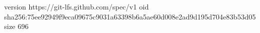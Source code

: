 version https://git-lfs.github.com/spec/v1
oid sha256:75ee92949f9eca09675c9031a63398b6a5ae60d008e2ad9d195d704e83b53d05
size 696
